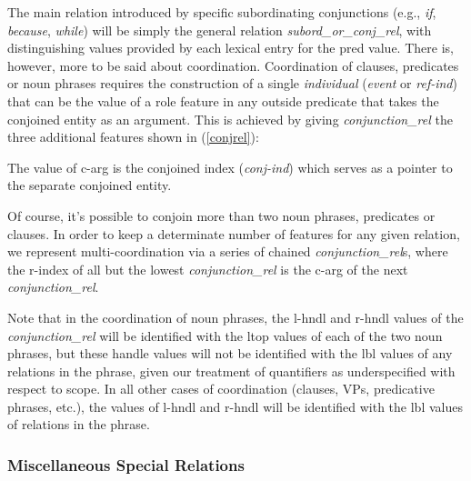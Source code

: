 \documentclass[12pt]{article}
\newcommand{\es}{\enumsentence}
\begin{document}
The main relation introduced by specific subordinating conjunctions (e.g., 
{\it if}, {\it because}, {\it while}) will be simply the general relation
{\it subord\_or\_conj\_rel}, with distinguishing values provided by
each lexical entry for the {\sc pred} value.  There
is, however, more to be said about coordination.  Coordination of clauses,
predicates or noun phrases requires the construction of a single {\it
individual} ({\it event} or {\it ref-ind}) that can be the value of a
role feature in any outside predicate that takes the conjoined
entity as an argument.  This is achieved by giving {\it conjunction\_rel}
the three additional features shown in (\ref{conjrel}):

\es{\label{conjrel}
\begin{avm}
\[ c-arg & conj-ind\\
   l-index & index\\ 
   r-index & index \]
\end{avm}
}
%
The value of {\sc c-arg} is the conjoined index ({\it conj-ind}) which
serves as a pointer to the separate conjoined entity.  

Of course, it's possible to conjoin more than two noun phrases,
predicates or clauses.  In order to keep a determinate number of
features for any given relation, we represent multi-coordination via a
series of chained {\it conjunction\_rel}s, where the {\sc r-index} of
all but the lowest {\it conjunction\_rel} is the {\sc c-arg} of the next
{\it conjunction\_rel}.

Note that in the coordination of noun phrases, the {\sc l-hndl} and 
{\sc r-hndl} values of the {\it conjunction\_rel} will be identified with the
{\sc ltop} values of each of the two noun phrases, but these handle values
will not be identified with the {\sc lbl} values of any relations in the
phrase, given our treatment of quantifiers as underspecified with respect to
scope.  In all other cases of coordination (clauses, VPs, predicative phrases,
etc.), the values of {\sc l-hndl} and {\sc r-hndl} will be identified with
the {\sc lbl} values of relations in the phrase.


\subsubsection{Miscellaneous Special Relations}

\end{document}
